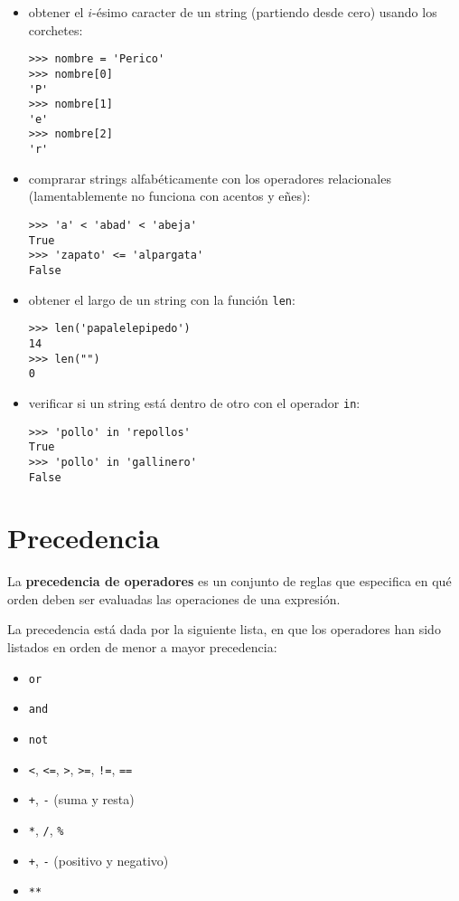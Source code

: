 \begin{itemize}
\item
  obtener el \(i\)-ésimo caracter de un string (partiendo desde cero)
  usando los corchetes:

\begin{lstlisting}
>>> nombre = 'Perico'
>>> nombre[0]
'P'
>>> nombre[1]
'e'
>>> nombre[2]
'r'
\end{lstlisting}
\item
  comprarar strings alfabéticamente con los operadores relacionales
  (lamentablemente no funciona con acentos y eñes):

\begin{lstlisting}
>>> 'a' < 'abad' < 'abeja'
True
>>> 'zapato' <= 'alpargata'
False
\end{lstlisting}
\item
  obtener el largo de un string con la función \lstinline!len!:

\begin{lstlisting}
>>> len('papalelepipedo')
14
>>> len("")
0
\end{lstlisting}
\item
  verificar si un string está dentro de otro con el operador
  \lstinline!in!:

\begin{lstlisting}
>>> 'pollo' in 'repollos'
True
>>> 'pollo' in 'gallinero'
False
\end{lstlisting}
\end{itemize}

\section{Precedencia}

La \textbf{precedencia de operadores} es un conjunto de reglas que
especifica en qué orden deben ser evaluadas las operaciones de una
expresión.

La precedencia está dada por la siguiente lista, en que los operadores
han sido listados en orden de menor a mayor precedencia:

\begin{itemize}
\item
  \lstinline!or!
\item
  \lstinline!and!
\item
  \lstinline!not!
\item
  \lstinline!<!, \lstinline!<=!, \lstinline!>!, \lstinline!>=!,
  \lstinline"!=", \lstinline!==!
\item
  \lstinline!+!, \lstinline!-! (suma y resta)
\item
  \lstinline!*!, \lstinline!/!, \lstinline!%!
\item
  \lstinline!+!, \lstinline!-! (positivo y negativo)
\item
  \lstinline!**!
\end{itemize}

